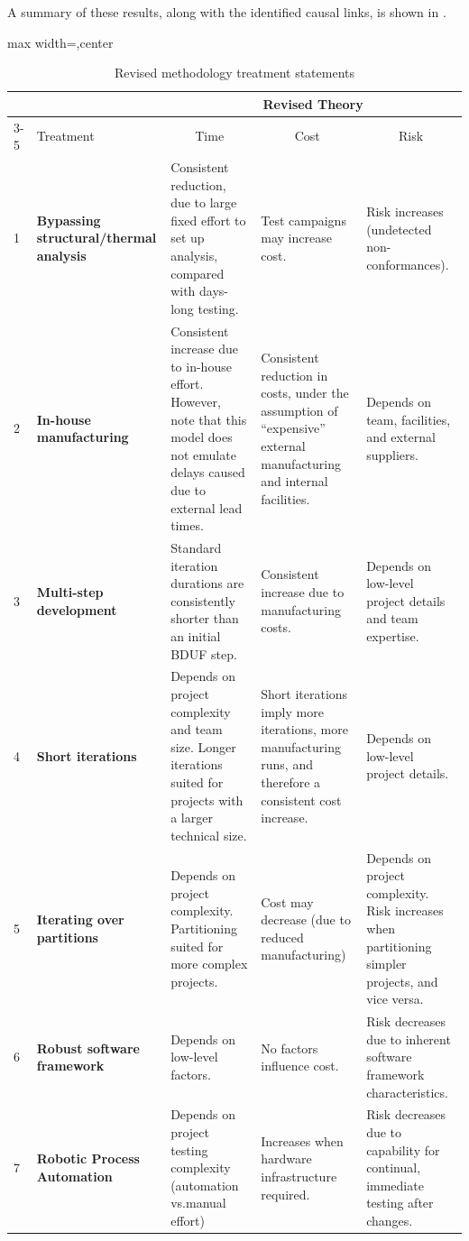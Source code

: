 \documentclass[a4paper,nobib,justified,final]{tufte-book}
\begin{document}
A summary of these results, along with the identified causal links, is shown in .

\begin{table}[]
\renewcommand{\arraystretch}{1.8}
\renewcommand\tabularxcolumn[1]{m{#1}}%
\begin{adjustbox}{max width=\textwidth,center}
\begin{tabularx}{1.2\textwidth}{@{}l>{\raggedright}m{3cm}XXX@{}}
\toprule
 &    &  \multicolumn{3}{c}{Revised Theory} \\ \cmidrule(lr){3-5}
 & Treatment & \multicolumn{1}{c}{Time} & \multicolumn{1}{c}{Cost} & \multicolumn{1}{c}{Risk} \\ \midrule
1 & \textbf{Bypassing structural/thermal analysis} & Consistent \textcolor{nice}{reduction}, due to large fixed effort to set up analysis, compared with days-long testing. & Test campaigns may \textcolor{bad}{increase} cost. & Risk \textcolor{bad}{increases} (undetected non-conformances). \\
2 & \textbf{In-house manufacturing} & Consistent \textcolor{bad}{increase} due to in-house effort. However, note that this model does not emulate delays caused due to external lead times. & Consistent \textcolor{nice}{reduction} in costs, under the assumption of ``expensive'' external manufacturing and internal facilities. & Depends on team, facilities, and external suppliers. \\
3 & \textbf{Multi-step development} & Standard iteration durations are consistently \textcolor{nice}{shorter} than an initial \acs{BDUF} step. & Consistent \textcolor{bad}{increase} due to manufacturing costs. & Depends on low-level project details and team expertise. \\
4 & \textbf{Short iterations} & Depends on project complexity and team size. Longer iterations suited for projects with a larger technical size. & Short iterations imply more iterations, more manufacturing runs, and therefore a consistent cost \textcolor{bad}{increase}. & Depends on low-level project details. \\
5 & \textbf{Iterating over partitions} & Depends on project complexity. Partitioning suited for more complex projects. &  Cost may \textcolor{nice}{decrease} (due to reduced manufacturing) & Depends on project complexity. Risk \textcolor{bad}{increases} when partitioning simpler projects, and vice versa. \\
6 & \textbf{Robust software framework} & Depends on low-level factors. & No factors influence cost. & Risk \textcolor{nice}{decreases} due to inherent software framework characteristics. \\
7 & \textbf{Robotic Process Automation} & Depends on project testing complexity (automation vs.\@ manual effort) & \textcolor{bad}{Increases} when hardware infrastructure required. &  Risk \textcolor{nice}{decreases} due to capability for continual, immediate testing after changes. \\ \bottomrule
\end{tabularx}
\end{adjustbox}
\caption{Revised methodology treatment statements}
\label{tab:d_new_statements}
\end{table}
\end{document}
